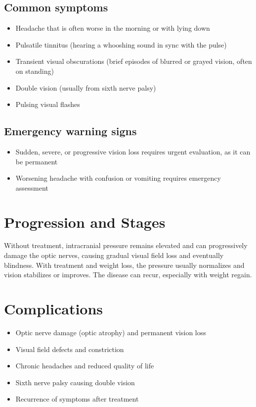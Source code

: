 \subsection{Common symptoms}
\begin{itemize}[noitemsep]
  \item Headache that is often worse in the morning or with lying down
  \item Pulsatile tinnitus (hearing a whooshing sound in sync with the pulse)
  \item Transient visual obscurations (brief episodes of blurred or grayed vision, often on standing)
  \item Double vision (usually from sixth nerve palsy)
  \item Pulsing visual flashes
\end{itemize}
\subsection{Emergency warning signs}
\begin{itemize}[noitemsep]
  \item Sudden, severe, or progressive vision loss requires urgent evaluation, as it can be permanent
  \item Worsening headache with confusion or vomiting requires emergency assessment
\end{itemize}
\section{Progression and Stages}
Without treatment, intracranial pressure remains elevated and can progressively damage the optic nerves, causing gradual visual field loss and eventually blindness. With treatment and weight loss, the pressure usually normalizes and vision stabilizes or improves. The disease can recur, especially with weight regain.
\section{Complications}
\begin{itemize}[noitemsep]
  \item Optic nerve damage (optic atrophy) and permanent vision loss
  \item Visual field defects and constriction
  \item Chronic headaches and reduced quality of life
  \item Sixth nerve palsy causing double vision
  \item Recurrence of symptoms after treatment
\end{itemize}
